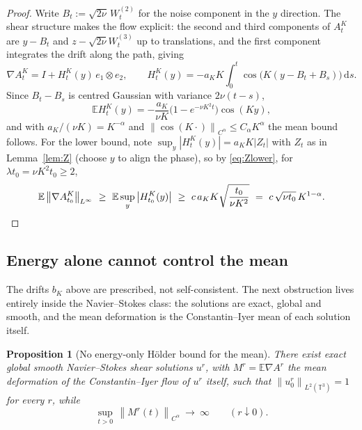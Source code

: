 \documentclass[11pt,reqno]{amsart}
\newcommand{\T}{\mathbb{T}}
\newcommand{\E}{\mathbb{E}}
\newcommand{\dd}{\,\mathrm{d}}
\newcommand{\norm}[1]{\left\lVert #1\right\rVert}
\newcommand{\abs}[1]{\left\lvert #1\right\rvert}
\newtheorem{proposition}[theorem]{Proposition}
\theoremstyle{definition}
\begin{document}
\begin{proof}
Write $B_t:=\sqrt{2\nu}\,W^{(2)}_t$ for the noise component in the $y$ direction. The
shear structure makes the flow explicit: the second and third components of $A_t^K$ are
$y-B_t$ and $z-\sqrt{2\nu}W_t^{(3)}$ up to translations, and the first component
integrates the drift along the path, giving
\[
  \nabla A^K_t=I+H^K_t(y)\,e_1\otimes e_2,\qquad
  H^K_t(y)=-a_KK\int_0^t\cos\bigl(K(y-B_t+B_s)\bigr)\dd s .
\]
Since $B_t-B_s$ is centred Gaussian with variance $2\nu(t-s)$,
\[
  \E H^K_t(y)=-\frac{a_K}{\nu K}\bigl(1-e^{-\nu K^2t}\bigr)\cos(Ky),
\]
and with $a_K/(\nu K)=K^{-\alpha}$ and $\norm{\cos(K\cdot)}_{C^\alpha}\le C_\alpha
K^{\alpha}$ the mean bound follows. For the lower bound, note
$\sup_y\abs{H^K_t(y)}=a_KK\abs{Z_t}$ with $Z_t$ as in Lemma~\ref{lem:Z} (choose $y$ to
align the phase), so by \eqref{eq:Zlower}, for $\lambda t_0=\nu K^2t_0\ge2$,
\[
  \E\norm{\nabla A^K_{t_0}}_{L^\infty}\ \ge\ \E\sup_y\abs{H^K_{t_0}(y)}
  \ \ge\ c\,a_KK\sqrt{\frac{t_0}{\nu K^2}}\ =\ c\,\sqrt{\nu t_0}\,K^{1-\alpha}. \qedhere
\]
\end{proof}

\subsection{Energy alone cannot control the mean}

The drifts $b_K$ above are prescribed, not self-consistent. The next obstruction lives
entirely inside the Navier--Stokes class: the solutions are exact, global and smooth, and
the mean deformation is the Constantin--Iyer mean of each solution itself.

\begin{proposition}[No energy-only H\"older bound for the mean]\label{prop:localshear}
There exist exact global smooth Navier--Stokes shear solutions $u^r$, with
$M^r=\E\nabla A^r$ the mean deformation of the Constantin--Iyer flow of $u^r$ itself, such
that $\norm{u^r_0}_{L^2(\T^3)}=1$ for every $r$, while
\[
  \sup_{t>0}\,\norm{M^r(t)}_{C^\alpha}\ \longrightarrow\ \infty\qquad(r\downarrow0).
\]
\end{proposition}
\end{document}
